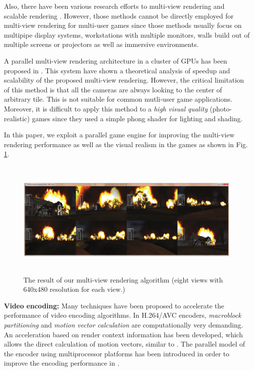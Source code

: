 \documentclass[conference]{IEEEtran}
\begin{document}
    Also, there have been various research efforts to multi-view rendering and scalable rendering \cite{Eilemann:2009}.
    However, those methods cannot be directly employed for multi-view rendering for multi-user games
    since those methods usually focus on multipipe display systems, workstations with multiple monitors, walls build out of multiple screens or projectors as well as immersive environments.

    A parallel multi-view rendering architecture in a cluster of GPUs has been proposed in \cite{Lages:2008}.
    This system have shown a theoretical analysis of speedup and scalability of the proposed multi-view rendering.
    However, the critical limitation of this method is that all the cameras are always looking to the center of arbitrary tile.
    This is not suitable for common mutli-user game applications.
    Moreover, it is difficult to apply this method to a \emph{high visual quality} (photo-realistic) games  since they used a simple phong shader for lighting and shading.

    In this paper, we exploit a parallel game engine for improving the multi-view rendering performance as well as the visual realism in the games as shown in Fig. \ref{fig:multi-view}.\\

    \begin{figure}[tbh] %
    \centering
    \includegraphics[height=5.8cm,keepaspectratio]{eight-view}
    \caption{The result of our multi-view rendering algorithm (eight views with 640x480 resolution for each view.)}
    \label{fig:multi-view}
    \end{figure}

    \noindent
    \textbf{Video encoding:}
    Many techniques have been proposed to accelerate the performance of video encoding algorithms.
    In H.264/AVC encoders, \emph{macroblock partitioning} and \emph{motion vector calculation} are computationally very demanding.
    An acceleration based on render context information has been developed, which allows the direct calculation of motion vectors, similar to \cite{Cheng:2004}.
    The parallel model of the encoder using multiprocessor platforms has been introduced in order to improve the encoding performance in \cite{Zrida:2009}.
\end{document}
